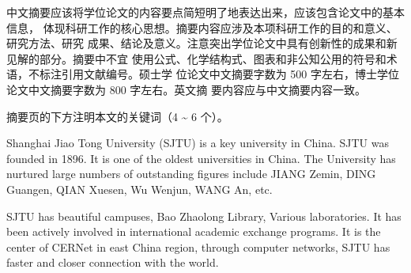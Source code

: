 
\begin{abstract*}[zh]
  中文摘要应该将学位论文的内容要点简短明了地表达出来，应该包含论文中的基本信息，
  体现科研工作的核心思想。摘要内容应涉及本项科研工作的目的和意义、研究方法、研究
  成果、结论及意义。注意突出学位论文中具有创新性的成果和新见解的部分。摘要中不宜
  使用公式、化学结构式、图表和非公知公用的符号和术语，不标注引用文献编号。硕士学
  位论文中文摘要字数为 500 字左右，博士学位论文中文摘要字数为 800 字左右。英文摘
  要内容应与中文摘要内容一致。

  摘要页的下方注明本文的关键词（4 \textasciitilde{} 6 个）。
\end{abstract*}

\begin{abstract*}[en]
  Shanghai Jiao Tong University (SJTU) is a key university in China. SJTU was
  founded in 1896. It is one of the oldest universities in China. The University
  has nurtured large numbers of outstanding figures include JIANG Zemin, DING
  Guangen, QIAN Xuesen, Wu Wenjun, WANG An, etc.

  SJTU has beautiful campuses, Bao Zhaolong Library, Various laboratories. It
  has been actively involved in international academic exchange programs. It is
  the center of CERNet in east China region, through computer networks, SJTU has
  faster and closer connection with the world.
\end{abstract*}
